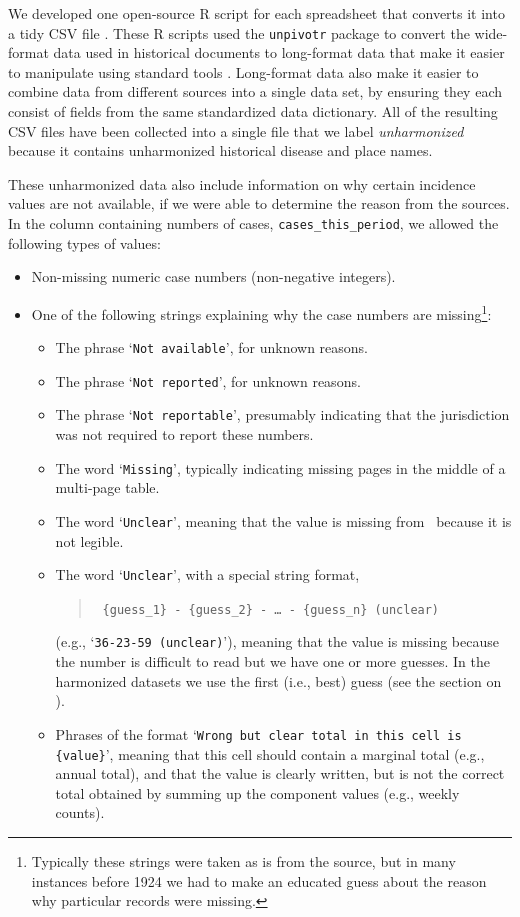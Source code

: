 \documentclass[12pt]{article}
\begin{document}
We developed one open-source R script for each spreadsheet that converts it into a tidy CSV file \cite{tidydata}. These R scripts used the \texttt{unpivotr} package \cite{unpivotr} to convert the wide-format data used in historical documents to long-format data that make it easier to manipulate using standard tools \cite{tidydata}. Long-format data also make it easier to combine data from different sources into a single data set, by ensuring they each consist of fields from the same standardized data dictionary. All of the resulting CSV files have been collected into a single file that we label \emph{unharmonized} because it contains unharmonized historical disease and place names.

These unharmonized data also include information on why certain incidence values are not available, if we were able to determine the reason from the sources. In the column containing numbers of cases, \texttt{cases\_this\_period}, we allowed the following types of values:
\begin{itemize}
\item Non-missing numeric case numbers (non-negative integers).
\item One of the following strings explaining why the case numbers are missing\footnote{Typically these strings were taken as is from the source, but in many instances before 1924 we had to make an educated guess about the reason why particular records were missing.}: 
  \begin{itemize}
    \item The phrase `\texttt{Not available}', for unknown reasons.
    \item The phrase `\texttt{Not reported}', for unknown reasons.
    \item The phrase `\texttt{Not reportable}', presumably indicating that the jurisdiction was not required to report these numbers.
    \item The word `\texttt{Missing}', typically indicating missing pages in the middle of a multi-page table.
    \item The word `\texttt{Unclear}', meaning that the value is missing from \datacronym\ because it is not legible.
    \item The word `\texttt{Unclear}', with a special string format,
    \begin{quote}
      \tt
      \{guess\_1\} - \{guess\_2\} - \dots\ - \{guess\_n\} (unclear) 
    \end{quote}
    (e.g., `\texttt{36-23-59 (unclear)}'), meaning that the value is missing because the number is difficult to read but we have one or more guesses. In the harmonized datasets we use the first (i.e., best) guess (see the section on ).
    \item Phrases of the format `\texttt{Wrong but clear total in this cell is \{value\}}', \break meaning that this cell should contain a marginal total (e.g., annual total), and that the value is clearly written, but is not the correct total obtained by summing up the component values (e.g., weekly counts).
  \end{itemize}
\end{itemize}
\end{document}
